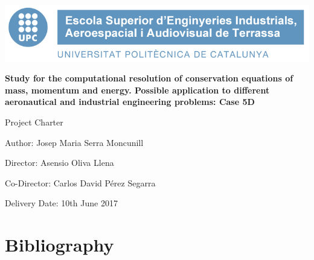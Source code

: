 \documentclass[12pt,a4paper]{article}
\begin{document}
\begin{titlepage}
\vspace*{50pt}
\begin{center}\includegraphics[scale=0.3]{./Media/logo_ESEIAAT.jpg}\end{center}
\vspace{25pt}
\begin{LARGE}\begin{center}\textbf{Study for the computational resolution of conservation equations of mass, momentum and energy. Possible application to different aeronautical and industrial engineering problems: Case 5D}\end{center}\end{LARGE}
\vspace{15pt}
\begin{LARGE}\begin{center}Project Charter\end{center}\end{LARGE}
\vspace{40pt}
\begin{center}{\large Author: Josep Maria Serra Moncunill}\end{center}
\vspace{25pt}
\begin{center}{\large Director: Asensio Oliva Llena}\end{center}
\begin{center}{\large Co-Director: Carlos David Pérez Segarra}\end{center}
\vspace{40pt}
\begin{center}{\normalsize Delivery Date: 10th June 2017}\end{center}
\end{titlepage}

\tableofcontents
\pagebreak











\section{Bibliography}


\end{document}

